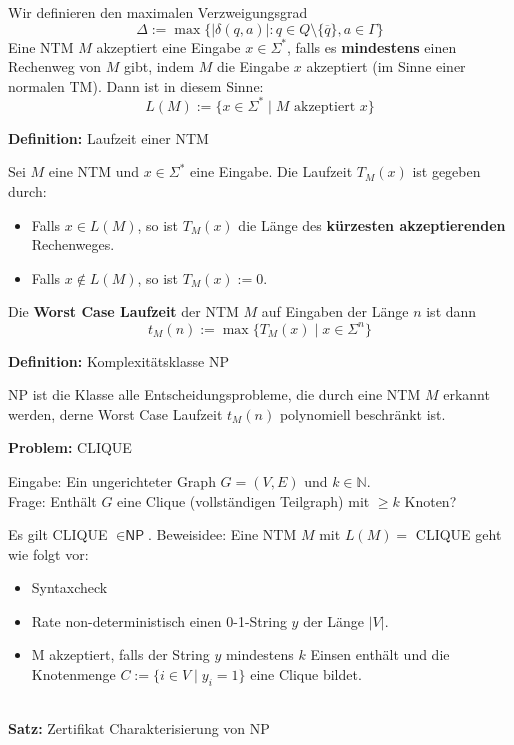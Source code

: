 \documentclass[a4paper,graphics,11pt]{article}
\begin{document}
Wir definieren den maximalen Verzweigungsgrad
$$
    \Delta := \max\{|\delta(q,a)| : q \in Q \setminus \{\overline{q}\}, a \in \Gamma\}
$$
Eine NTM $M$ akzeptiert eine Eingabe $x \in \Sigma^*$,
falls es \textbf{mindestens} einen Rechenweg von $M$ gibt,
indem $M$ die Eingabe $x$ akzeptiert (im Sinne einer normalen TM). Dann ist in diesem Sinne:
$$
    L(M) := \{x \in \Sigma^* \mid M \text{ akzeptiert } x\}
$$

\strut

\textbf{Definition:} Laufzeit einer NTM

Sei $M$ eine NTM und $x \in \Sigma^*$ eine Eingabe. Die Laufzeit $T_M(x)$ ist gegeben durch:
\begin{itemize}
    \item Falls $x \in L(M)$, so ist $T_M(x)$ die Länge des \textbf{kürzesten akzeptierenden} Rechenweges.
    \item Falls $x \notin L(M)$, so ist $T_M(x) := 0$.
\end{itemize}
Die \textbf{Worst Case Laufzeit} der NTM $M$ auf Eingaben der Länge $n$ ist dann
$$
    t_M(n) := \max\{T_M(x) \mid x \in \Sigma^n\}
$$

\strut

\textbf{Definition:} Komplexitätsklasse \textsf{NP}

\textsf{NP} ist die Klasse alle Entscheidungsprobleme, die durch eine NTM $M$ erkannt werden,
derne Worst Case Laufzeit $t_M(n)$ polynomiell beschränkt ist.

\strut

\textbf{Problem:} CLIQUE

Eingabe: Ein ungerichteter Graph $G = (V,E)$ und $k \in \mathbb{N}$.\\
Frage: Enthält $G$ eine Clique (vollständigen Teilgraph) mit $\geq k$ Knoten?

Es gilt CLIQUE $\in \textsf{NP}$. Beweisidee: Eine NTM $M$ mit $L(M) = $ CLIQUE geht wie folgt vor:
\begin{itemize}
    \item Syntaxcheck
    \item Rate non-deterministisch einen 0-1-String $y$ der Länge $|V|$.
    \item M akzeptiert, falls der String $y$ mindestens $k$ Einsen enthält und die Knotenmenge
        $C := \{i \in V \mid y_i = 1\}$ eine Clique bildet.
\end{itemize}

\strut\\

\textbf{Satz:} Zertifikat Charakterisierung von \textsf{NP}
\end{document}
